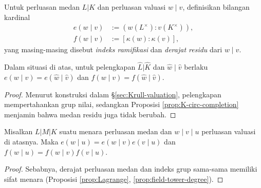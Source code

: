 \begin{definition}
	Untuk perluasan medan $L|K$ dan perluasan valuasi $w \mid v$, definisikan bilangan kardinal
	\begin{align*}
		e(w \mid v) & := ( w(L^\times) : v(K^\times) ), \\
		f(w \mid v) & := [ \kappa(w): \kappa(v) ],
	\end{align*}
	yang masing-masing disebut \emph{indeks ramifikasi} dan \emph{derajat residu} dari $w \mid v$. 
\end{definition}

\begin{proposition}\label{prop:ef-completion}
	Dalam situasi di atas, untuk pelengkapan $\hat{L} | \hat{K}$ dan $\hat{w} \mid \hat{v}$ berlaku $e(w \mid v) = e(\hat{w} \mid \hat{v})$ dan $f(w \mid v) = f(\hat{w} \mid \hat{v})$.
\end{proposition}
\begin{proof}
	Menurut konstruksi dalam \S\ref{sec:Krull-valuation}, pelengkapan mempertahankan grup nilai, sedangkan Proposisi \ref{prop:K-circ-completion} menjamin bahwa medan residu juga tidak berubah.
\end{proof}

\begin{proposition}\label{prop:e-f-tower}
	Misalkan $L|M|K$ suatu menara perluasan medan dan $w \mid v \mid u$ perluasan valuasi di atasnya. Maka $e(w \mid u) = e(w \mid v)e(v \mid  u)$ dan $f(w \mid u) = f(w \mid v)f(v \mid u)$.
\end{proposition}
\begin{proof}
	Sebabnya, derajat perluasan medan dan indeks grup sama-sama memiliki sifat menara (Proposisi \ref{prop:Lagrange}, \ref{prop:field-tower-degree}).
\end{proof}

